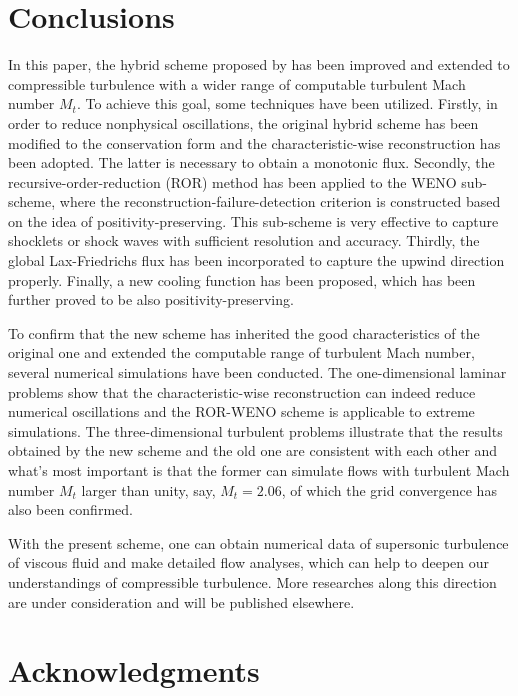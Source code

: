 \documentclass[review]{elsarticle}
\begin{document}
\section{Conclusions}\label{sec.5}

In this paper, the hybrid scheme proposed by \citet{Wang2010} has been improved and extended to compressible turbulence with a wider range of computable turbulent Mach number $M_t$. To achieve this goal, some techniques have been utilized. Firstly, in order to reduce nonphysical oscillations, the original hybrid scheme has been modified to the conservation form and the characteristic-wise reconstruction has been adopted. The latter is necessary to obtain a monotonic flux. Secondly, the recursive-order-reduction (ROR) method has been applied to the WENO sub-scheme, where the reconstruction-failure-detection criterion is constructed based on the idea of positivity-preserving. This sub-scheme is very effective to capture shocklets or shock waves with sufficient resolution and accuracy. Thirdly, the global Lax-Friedrichs flux has been incorporated to capture the upwind direction properly. Finally, a new cooling function has been proposed, which has been further proved to be also positivity-preserving.

To confirm that the new scheme has inherited the good characteristics of the original one and extended the computable range of turbulent Mach number, several numerical simulations have been conducted. The one-dimensional laminar problems show that the characteristic-wise reconstruction can indeed reduce numerical oscillations and the ROR-WENO scheme is applicable to extreme simulations. The three-dimensional turbulent problems illustrate that the results obtained by the new scheme and the old one are consistent with each other and what's most important is that the former can simulate flows with turbulent Mach number $M_t$ larger than unity, say, $M_t = 2.06$, of which the grid convergence has also been confirmed.

With the present scheme, one can obtain numerical data of supersonic turbulence of viscous fluid and make detailed flow analyses, which can help to deepen our understandings of compressible turbulence. More researches along this direction are under consideration and will be published elsewhere.



\section*{Acknowledgments}
\end{document}
